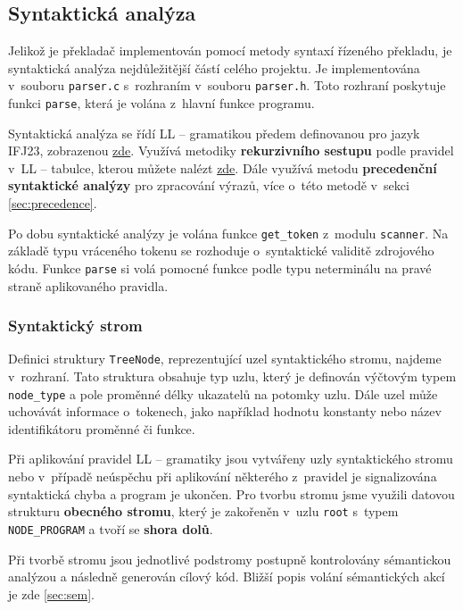 \documentclass[a4paper, 11pt]{article}
\begin{document}
	\subsection{Syntaktická analýza}
	Jelikož je překladač implementován pomocí metody syntaxí řízeného překladu, je syntaktická analýza nej\-důležitější částí celého projektu.
	Je implementována v~souboru \texttt{parser.c} s~rozhraním v~souboru \texttt{parser.h}. Toto rozhraní poskytuje funkci \texttt{parse}, která je volána z~hlavní funkce programu.
	\par\noindent Syntaktická analýza se řídí LL -- gramatikou předem definovanou pro jazyk IFJ23, zobrazenou \hyperref[sec:ll_grammar]{zde}. Využívá metodiky \textbf{rekurzivního sestupu} podle pravidel v~LL -- tabulce, kterou můžete nalézt \hyperref[sec:ll_table]{zde}.
	Dále využívá metodu \textbf{precedenční syntaktické analýzy} pro zpracování výrazů, více o~této metodě v~sekci \ref{sec:precedence}.
	\par\noindent Po dobu syntaktické analýzy je volána funkce \texttt{get\_token} z~modulu \texttt{scanner}. Na základě typu vráceného tokenu se rozhoduje o~syntaktické validitě zdrojového kódu. Funkce \texttt{parse} si volá pomocné funkce podle typu neterminálu na pravé straně aplikovaného pravidla.

	\subsubsection{Syntaktický strom}
	Definici struktury \texttt{TreeNode}, reprezentující uzel syntaktického stromu, najdeme v~rozhraní. Tato struktura obsahuje typ uzlu, který je definován výčtovým typem \texttt{node\_type} a pole proměnné délky ukazatelů na potomky uzlu. 
	Dále uzel může uchovávát informace o~tokenech, jako například hodnotu konstanty nebo název identifikátoru proměnné či funkce.
	\par\noindent Při aplikování pravidel LL -- gramatiky jsou vytvářeny uzly syntaktického stromu nebo v~případě neúspěchu při aplikování některého z~pravidel je signalizována syntaktická chyba a program je ukončen.
	Pro tvorbu stromu jsme využili datovou strukturu \textbf{obecného stromu}, který je zakořeněn v~uzlu \texttt{root} s~typem \texttt{NODE\_PROGRAM} a tvoří se \textbf{shora dolů}.
	\par\noindent Při tvorbě stromu jsou jednotlivé podstromy postupně kontrolovány sémantickou analýzou a následně generován cílový kód. Bližší popis volání sémantic\-kých akcí je zde \ref{sec:sem}.
\end{document}
